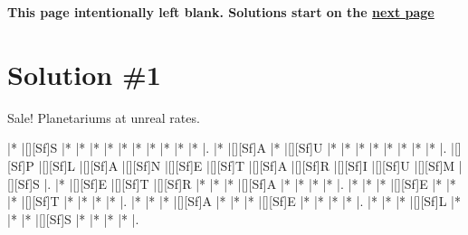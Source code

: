 \documentclass[letterpaper]{article}
\begin{document}

\newpage
\begin{center}
\textbf{This page intentionally left blank. Solutions start on the \hyperlink{page.3}{next page}}
\end{center}

\newpage

\section*{Solution \#1}
Sale! Planetariums at unreal rates.

\vspace*{0.5cm}
\begin{Puzzle}{12}{8}
|*        |[][Sf]S  |*        |*        |*        |*        |*        |*        |*        |*        |*        |*        |.
|*        |[][Sf]A  |*        |[][Sf]U  |*        |*        |*        |*        |*        |*        |*        |*        |.
|[][Sf]P  |[][Sf]L  |[][Sf]A  |[][Sf]N  |[][Sf]E  |[][Sf]T  |[][Sf]A  |[][Sf]R  |[][Sf]I  |[][Sf]U  |[][Sf]M  |[][Sf]S  |.
|*        |[][Sf]E  |[][Sf]T  |[][Sf]R  |*        |*        |*        |[][Sf]A  |*        |*        |*        |*        |.
|*        |*        |*        |[][Sf]E  |*        |*        |*        |[][Sf]T  |*        |*        |*        |*        |.
|*        |*        |*        |[][Sf]A  |*        |*        |*        |[][Sf]E  |*        |*        |*        |*        |.
|*        |*        |*        |[][Sf]L  |*        |*        |*        |[][Sf]S  |*        |*        |*        |*        |.
\end{Puzzle}
\end{document}
